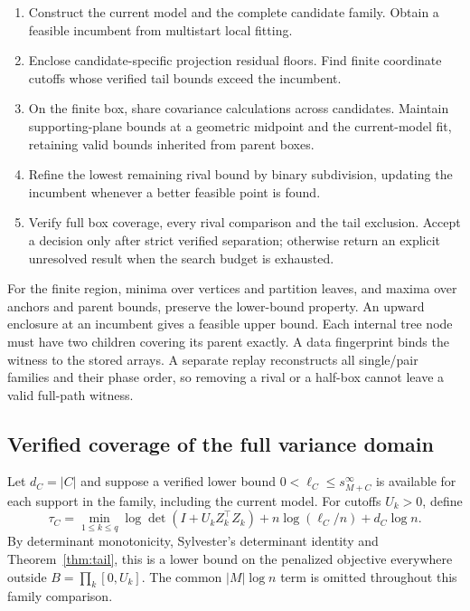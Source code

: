 \documentclass[preprint,11pt,numbers]{elsarticle}
\theoremstyle{remark}\newtheorem{remark}[theorem]{Remark}
\begin{document}
\begin{enumerate}
\item Construct the current model and the complete candidate family. Obtain a
feasible incumbent from multistart local fitting.
\item Enclose candidate-specific projection residual floors. Find finite
coordinate cutoffs whose verified tail bounds exceed the incumbent.
\item On the finite box, share covariance calculations across candidates.
Maintain supporting-plane bounds at a geometric midpoint and the current-model
fit, retaining valid bounds inherited from parent boxes.
\item Refine the lowest remaining rival bound by binary subdivision, updating
the incumbent whenever a better feasible point is found.
\item Verify full box coverage, every rival comparison and the tail exclusion.
Accept a decision only after strict verified separation; otherwise return an
explicit unresolved result when the search budget is exhausted.
\end{enumerate}

For the finite region, minima over vertices and partition leaves, and maxima
over anchors and parent bounds, preserve the lower-bound property. An upward
enclosure at an incumbent gives a feasible upper bound. Each internal tree node
must have two children covering its parent exactly. A data fingerprint binds the
witness to the stored arrays. A separate replay reconstructs all single/pair
families and their phase order, so removing a rival or a half-box cannot leave
a valid full-path witness.

\subsection{Verified coverage of the full variance domain}
Let $d_C=|C|$ and suppose a verified lower bound
$0<\ell_C\leq s_{M+C}^{\infty}$ is available for each support in the family,
including the current model. For cutoffs $U_k>0$, define
\begin{equation}\label{eq:verifiedtail}
\tau_C=\min_{1\leq k\leq q}\log\det(I+U_kZ_k^\top Z_k)
       +n\log(\ell_C/n)+d_C\log n.
\end{equation}
By determinant monotonicity, Sylvester's determinant identity and
Theorem~\ref{thm:tail}, this is a lower bound on the penalized objective everywhere
outside $B=\prod_k[0,U_k]$. The common $|M|\log n$ term is omitted throughout
this family comparison.
\end{document}
